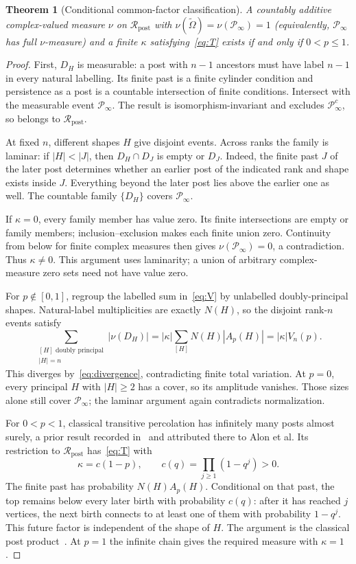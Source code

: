 \documentclass[11pt]{article}
\newtheorem{theorem}{Theorem}
\theoremstyle{definition}
\newcommand{\Om}{\widetilde\Omega}
\newcommand{\Rp}{\mathcal R_{\mathrm{post}}}
\newcommand{\Pinfty}{\mathcal P_\infty}
\begin{document}
\begin{theorem}[Conditional common-factor classification]\label{thm:cov}
A countably additive complex-valued measure $\nu$ on $\Rp$ with
$\nu(\Om)=\nu(\Pinfty)=1$ (equivalently, $\Pinfty$ has full
$\nu$-measure) and a finite $\kappa$ satisfying~\eqref{eq:T}
exists if and only if $0<p\le1$.
\end{theorem}
\begin{proof}
First, $D_H$ is measurable: a post with $n-1$ ancestors must have label
$n-1$ in every natural labelling. Its finite past is a finite cylinder
condition and persistence as a post is a countable intersection of finite
conditions. Intersect with the measurable event $\Pinfty$. The result is
isomorphism-invariant and excludes $\Pinfty^c$, so belongs to $\Rp$.

At fixed $n$, different shapes $H$ give disjoint events. Across ranks the
family is laminar: if $|H|<|J|$, then $D_H\cap D_J$ is empty or $D_J$.
Indeed, the finite past $J$ of the later post determines whether an earlier
post of the indicated rank and shape exists inside $J$. Everything beyond
the later post lies above the earlier one as well. The countable family
$\{D_H\}$ covers $\Pinfty$.

If $\kappa=0$, every family member has value zero. Its finite intersections
are empty or family members; inclusion--exclusion makes each finite union
zero. Continuity from below for finite complex measures then gives
$\nu(\Pinfty)=0$, a contradiction. Thus $\kappa\ne0$. This argument uses
laminarity; a union of arbitrary complex-measure zero sets need not have
value zero.

For $p\notin[0,1]$, regroup the labelled sum in~\eqref{eq:V} by unlabelled
doubly-principal shapes. Natural-label multiplicities are exactly $N(H)$,
so the disjoint rank-$n$ events satisfy
\begin{equation}\label{eq:cov-variation}
 \sum_{\substack{[H]\text{ doubly principal}\\ |H|=n}}|\nu(D_H)|
 =|\kappa|\sum_{[H]}N(H)|A_p(H)|=|\kappa|V_n(p).
\end{equation}
This diverges by~\eqref{eq:divergence}, contradicting finite total variation.
At $p=0$, every principal $H$ with $|H|\ge2$ has a cover, so its amplitude
vanishes. Those sizes alone still cover $\Pinfty$; the laminar argument
again contradicts normalization.

For $0<p<1$, classical transitive percolation has infinitely many posts
almost surely, a prior result recorded in~\cite[Sec.~2]{BSW} and attributed
there to Alon et al. Its restriction to $\Rp$ has~\eqref{eq:T} with
\begin{equation}\label{eq:kappa}
 \kappa=c(1-p),\qquad c(q)=\prod_{j\ge1}(1-q^j)>0.
\end{equation}
The finite past has probability $N(H)A_p(H)$. Conditional on that past, the
top remains below every later birth with probability $c(q)$: after it has
reached $j$ vertices, the next birth connects to at least one of them with
probability $1-q^j$. This future factor is independent of the shape of $H$.
The argument is the classical post product~\cite[Theorem~2.1]{BSW}.
At $p=1$ the infinite chain gives the required measure with $\kappa=1$.
\end{proof}
\end{document}
